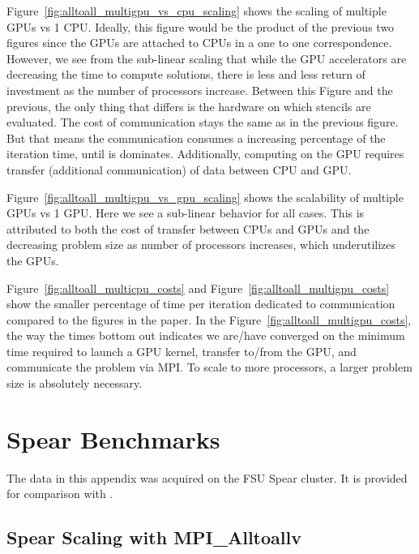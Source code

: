 Figure~\ref{fig:alltoall_multigpu_vs_cpu_scaling}  shows the scaling of multiple GPUs vs 1 CPU. Ideally, this figure would be the product of the previous two figures since the GPUs are attached to CPUs in a one to one correspondence. However, we see from the sub-linear scaling that while the GPU accelerators are decreasing the time to compute solutions, there is less and less return of investment as the number of processors increase. Between this Figure and the previous, the only thing that differs is the hardware on which stencils are evaluated. The cost of communication stays the same as in the previous figure. But that means the communication consumes a increasing percentage of the iteration time, until is dominates. 
Additionally, computing on the GPU requires transfer (additional communication) of data between CPU and GPU. 

Figure~\ref{fig:alltoall_multigpu_vs_gpu_scaling} shows the scalability of multiple GPUs vs 1 GPU. Here we see a sub-linear behavior for all cases. This is attributed to both the cost of transfer between CPUs and GPUs and the decreasing problem size as number of processors increases, which underutilizes the GPUs. 


Figure~\ref{fig:alltoall_multicpu_costs} and Figure~\ref{fig:alltoall_multigpu_costs} show the smaller percentage of time per iteration dedicated to communication compared to the figures in the paper. In the Figure~\ref{fig:alltoall_multigpu_costs}, the way the times bottom out indicates we are/have converged on the minimum time required to launch a GPU kernel, transfer to/from the GPU, and communicate the problem via MPI. To scale to more processors, a larger problem size is absolutely necessary.





\chapter{Spear Benchmarks} 
\label{app:spear_alltoallv_benchmarks}

The data in this appendix was acquired on the FSU Spear cluster. It is provided for comparison with \cite{BolligFlyerErlebacher2012}.

\section{Spear Scaling with MPI\_Alltoallv}


